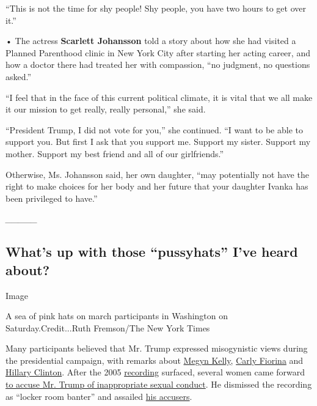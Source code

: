 ``This is not the time for shy people! Shy people, you have two hours to
get over it.''

• The actress \textbf{Scarlett Johansson} told a story about how she had
visited a Planned Parenthood clinic in New York City after starting her
acting career, and how a doctor there had treated her with compassion,
``no judgment, no questions asked.''

``I feel that in the face of this current political climate, it is vital
that we all make it our mission to get really, really personal,'' she
said.

``President Trump, I did not vote for you,'' she continued. ``I want to
be able to support you. But first I ask that you support me. Support my
sister. Support my mother. Support my best friend and all of our
girlfriends.''

Otherwise, Ms. Johansson said, her own daughter, ``may potentially not
have the right to make choices for her body and her future that your
daughter Ivanka has been privileged to have.''

\emph{\_\_\_\_\_}

\hypertarget{whats-up-with-those-pussyhats-ive-heard-about}{%
\subsection{What's up with those ``pussyhats'' I've heard
about?}\label{whats-up-with-those-pussyhats-ive-heard-about}}

Image

A sea of pink hats on march participants in Washington on
Saturday.Credit...Ruth Fremson/The New York Times

Many participants believed that Mr. Trump expressed misogynistic views
during the presidential campaign, with remarks about
\href{https://www.nytimes.com/2016/11/16/business/media/megyn-kellys-cautionary-tale-of-crossing-donald-j-trump.html}{Megyn
Kelly},
\href{https://www.nytimes.com/politics/first-draft/2015/09/10/donald-trumps-uncomplimentary-comments-about-carly-fiorina/}{Carly
Fiorina} and
\href{https://www.nytimes.com/2016/10/21/us/politics/hillary-clinton-women.html}{Hillary
Clinton}. After the 2005
\href{https://www.nytimes.com/2016/10/08/us/donald-trump-tape-transcript.html}{recording}
surfaced, several women came forward
\href{https://www.nytimes.com/2016/10/21/us/politics/donald-trump-women.html}{to
accuse Mr. Trump of inappropriate sexual conduct}. He dismissed the
recording as ``locker room banter'' and assailed
\href{https://www.nytimes.com/2016/10/15/us/politics/donald-trump-campaign.html}{his
accusers}.

